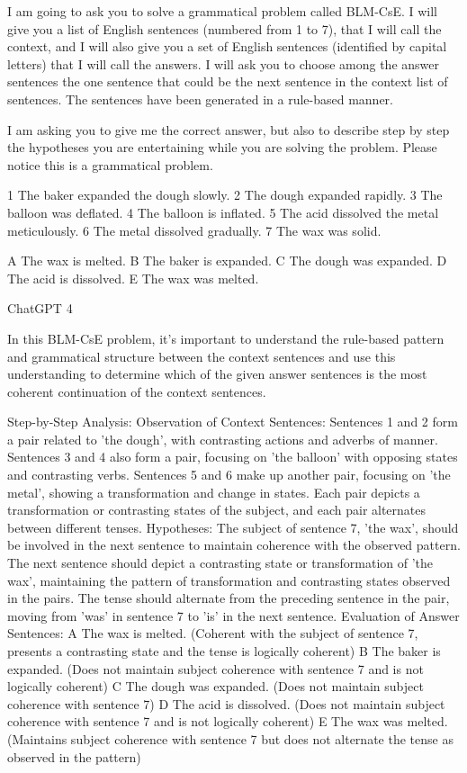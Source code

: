 I am going to ask you to solve a grammatical problem called BLM-CsE.  I will give you a list of English sentences (numbered from 1 to 7), that I will call the context, and I will also give you a set of English sentences (identified by capital letters) that I will call  the answers. I will ask you to choose among the answer sentences the one sentence that could be the next sentence in the context list of sentences. The sentences have been generated in a rule-based manner. 

I am asking you to give me the correct answer, but also to describe step by step  the hypotheses you are entertaining while you are solving the problem. Please notice this is a grammatical problem.


1 The baker expanded the dough slowly.
2 The dough expanded rapidly.
3 The balloon was deflated.
4 The balloon is inflated.
5 The acid dissolved the metal meticulously.
6 The metal dissolved gradually.
7 The wax was solid.

A The wax is melted.
B The baker is expanded.
C The dough was expanded.
D The acid is dissolved.
E The wax was melted.

ChatGPT 4

In this BLM-CsE problem, it's important to understand the rule-based pattern and grammatical structure between the context sentences and use this understanding to determine which of the given answer sentences is the most coherent continuation of the context sentences.

Step-by-Step Analysis:
Observation of Context Sentences:
Sentences 1 and 2 form a pair related to 'the dough', with contrasting actions and adverbs of manner.
Sentences 3 and 4 also form a pair, focusing on 'the balloon' with opposing states and contrasting verbs.
Sentences 5 and 6 make up another pair, focusing on 'the metal', showing a transformation and change in states.
Each pair depicts a transformation or contrasting states of the subject, and each pair alternates between different tenses.
Hypotheses:
The subject of sentence 7, 'the wax', should be involved in the next sentence to maintain coherence with the observed pattern.
The next sentence should depict a contrasting state or transformation of 'the wax', maintaining the pattern of transformation and contrasting states observed in the pairs.
The tense should alternate from the preceding sentence in the pair, moving from 'was' in sentence 7 to 'is' in the next sentence.
Evaluation of Answer Sentences:
A The wax is melted. (Coherent with the subject of sentence 7, presents a contrasting state and the tense is logically coherent)
B The baker is expanded. (Does not maintain subject coherence with sentence 7 and is not logically coherent)
C The dough was expanded. (Does not maintain subject coherence with sentence 7)
D The acid is dissolved. (Does not maintain subject coherence with sentence 7 and is not logically coherent)
E The wax was melted. (Maintains subject coherence with sentence 7 but does not alternate the tense as observed in the pattern)

